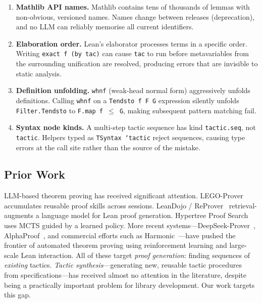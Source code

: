 \documentclass{llncs}
\begin{document}
\begin{enumerate}
  \item \textbf{Mathlib API names.}  Mathlib contains tens of thousands of
        lemmas with non-obvious, versioned names.  Names change between
        releases (deprecation), and no LLM can reliably memorise all current
        identifiers.

  \item \textbf{Elaboration order.}  Lean's elaborator processes terms in a
        specific order.  Writing \texttt{exact f (by tac)} can cause
        \texttt{tac} to run before metavariables from the surrounding
        unification are resolved, producing errors that are invisible to
        static analysis.

  \item \textbf{Definition unfolding.}  \texttt{whnf} (weak-head normal form)
        aggressively unfolds definitions.  Calling \texttt{whnf} on a
        \texttt{Tendsto~f~F~G} expression silently unfolds \texttt{Filter.Tendsto}
        to \texttt{F.map~f~$\leq$~G}, making subsequent pattern matching fail.

  \item \textbf{Syntax node kinds.}  A multi-step tactic sequence has kind
        \texttt{tactic.seq}, not \texttt{tactic}.  Helpers typed as
        \texttt{TSyntax `tactic} reject sequences, causing type errors at
        the call site rather than the source of the mistake.
\end{enumerate}

\subsection{Prior Work}

LLM-based theorem proving has received significant attention.
LEGO-Prover~\cite{xia2024legoprover} accumulates reusable proof skills across sessions.
LeanDojo / ReProver~\cite{yang2024leandojo} retrieval-augments a language model
for Lean proof generation.
Hypertree Proof Search~\cite{lample2022hypertree} uses MCTS guided by a learned policy.
More recent systems---DeepSeek-Prover~\cite{deepseek2024prover},
AlphaProof~\cite{alphaproof2024}, and commercial efforts such as
Harmonic~\cite{harmonic2024}---have pushed the frontier of automated theorem proving
using reinforcement learning and large-scale Lean interaction.
All of these target \emph{proof generation}: finding sequences of \emph{existing} tactics.
\emph{Tactic synthesis}---generating new, reusable tactic procedures from
specifications---has received almost no attention in the literature,
despite being a practically important problem for library development.
Our work targets this gap.
\end{document}
